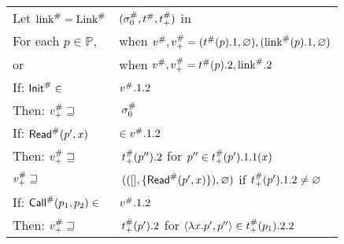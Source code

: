 \begin{center}
  \begin{tabular}{|l@{\hskip2pt}l|}
    \hline
    \hfill Let ${\textnormal{link}}^{\#}={\textnormal{Link}}^{\#}$                         & $({\sigma}^{\#}_0,{t}^{\#},{t}^{\#}_+)$ in                                                                                                               \\
    \hfill For each $p\in\mathbb{P}$,                        & when ${v}^{\#},{v}^{\#}_+=({t}^{\#}(p).1,\varnothing),({\textnormal{link}}^{\#}(p).1,\varnothing)$                                                                     \\
    \hfill or                                                & when ${v}^{\#},{v}^{\#}_+={t}^{\#}(p).2,{\textnormal{link}}^{\#}.2$                                                                                                    \\
    \hline
    If:           \hfill ${\mathsf{Init}}^{\#}\in$                     & ${v}^{\#}.1.2$                                                                                                                                           \\
    Then:         \hfill ${v}^{\#}_+\sqsupseteq$              & $\:{\sigma}^{\#}_0$                                                                                                                                          \\
    \hline
    If:           \hfill ${\mathsf{Read}}^{\#}(p',x)$                  & $\in{v}^{\#}.1.2$                                                                                                                                        \\
    Then:         \hfill ${v}^{\#}_+\sqsupseteq$              & $\:{t}^{\#}_+(p'').2$                                                             \hfill for $p''\in{t}^{\#}_+(p').1.1(x)$                          \\
    \hfill ${v}^{\#}_+\sqsupseteq$                            & $\:(([],\{{\mathsf{Read}}^{\#}(p',x)\}),\varnothing)$                                         \hfill if ${t}^{\#}_+(p').1.2\neq\varnothing$                     \\
    \hline
    If:           \hfill ${\mathsf{Call}}^{\#}(p_1,p_2)\in$            & ${v}^{\#}.1.2$                                                                                                                                           \\
    Then:         \hfill ${v}^{\#}_+\sqsupseteq$              & $\:{t}^{\#}_+(p').2$                                                              \hfill for $\langle\lambda x.p',p''\rangle\in{t}^{\#}_+(p_1).2.2$ \\

\end{tabular}
\end{center}
